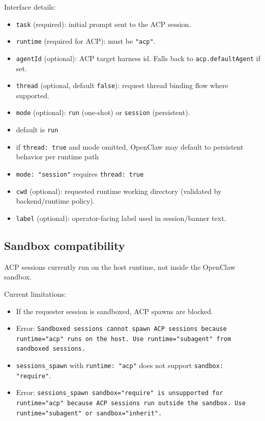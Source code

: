 Interface details:

\begin{itemize}
  \item \texttt{task} (required): initial prompt sent to the ACP session.
  \item \texttt{runtime} (required for ACP): must be \texttt{"acp"}.
  \item \texttt{agentId} (optional): ACP target harness id. Falls back to \texttt{acp.defaultAgent} if set.
  \item \texttt{thread} (optional, default \texttt{false}): request thread binding flow where supported.
  \item \texttt{mode} (optional): \texttt{run} (one-shot) or \texttt{session} (persistent).
  \item default is \texttt{run}
  \item if \texttt{thread: true} and mode omitted, OpenClaw may default to persistent behavior per runtime path
  \item \texttt{mode: "session"} requires \texttt{thread: true}
  \item \texttt{cwd} (optional): requested runtime working directory (validated by backend/runtime policy).
  \item \texttt{label} (optional): operator-facing label used in session/banner text.
\end{itemize}


\subsection{Sandbox compatibility}


ACP sessions currently run on the host runtime, not inside the OpenClaw sandbox.

Current limitations:

\begin{itemize}
  \item If the requester session is sandboxed, ACP spawns are blocked.
  \item Error: \texttt{Sandboxed sessions cannot spawn ACP sessions because runtime="acp" runs on the host. Use runtime="subagent" from sandboxed sessions.}
  \item \texttt{sessions\_spawn} with \texttt{runtime: "acp"} does not support \texttt{sandbox: "require"}.
  \item Error: \texttt{sessions\_spawn sandbox="require" is unsupported for runtime="acp" because ACP sessions run outside the sandbox. Use runtime="subagent" or sandbox="inherit".}
\end{itemize}


